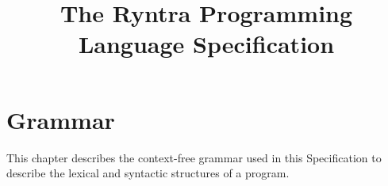 \documentclass[11pt]{book}
\title{The Ryntra Programming Language Specification}
\begin{document}

    \onehalfspacing

    \newcommand{\codeinline}[1]{\texttt|#1|}

    \chapter{Grammar}\label{ch:grammar}

    This chapter describes the context-free grammar used in this Specification
    to describe the lexical and syntactic structures of a program.

    \clearpage

    
    
\end{document}
